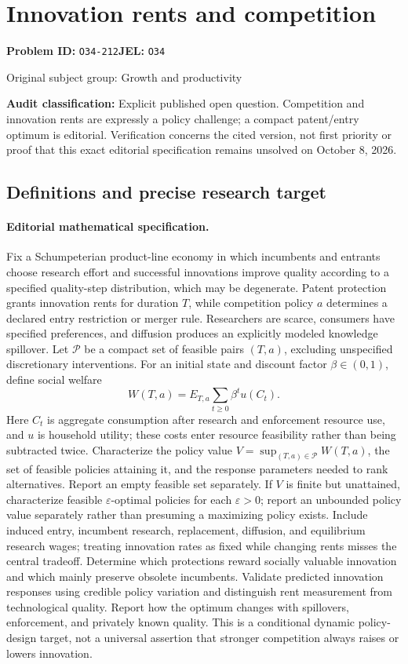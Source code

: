 \documentclass[11pt,a4paper]{article}
\begin{document}
\section*{Innovation rents and competition}
\textbf{Problem ID:} \texttt{O34-212}\quad \textbf{JEL:} \texttt{O34}\par
\label{problem:OP-0268}
{\sffamily\small\color{muted}Original subject group: Growth and productivity\par}
\label{definitions:problem:30007549}
\textbf{Audit classification:} Explicit published open question. Competition and innovation rents are expressly a policy challenge; a compact patent/entry optimum is editorial. Verification concerns the cited version, not first priority or proof that this exact editorial specification remains unsolved on October 8, 2026.
\subsection*{Definitions and precise research target}
\paragraph{Editorial mathematical specification.} Fix a Schumpeterian product-line economy in which incumbents and entrants choose research effort and successful innovations improve quality according to a specified quality-step distribution, which may be degenerate. Patent protection grants innovation rents for duration \(T\), while competition policy \(a\) determines a declared entry restriction or merger rule. Researchers are scarce, consumers have specified preferences, and diffusion produces an explicitly modeled knowledge spillover. Let \(\mathcal P\) be a compact set of feasible pairs \((T,a)\), excluding unspecified discretionary interventions.
For an initial state and discount factor \(\beta\in(0,1)\), define social welfare
\[
W(T,a)=E_{T,a}\sum_{t\ge0}\beta^t
u(C_t).
\]
Here \(C_t\) is aggregate consumption after research and enforcement resource use, and \(u\) is household utility; these costs enter resource feasibility rather than being subtracted twice. Characterize the policy value \(V=\sup_{(T,a)\in\mathcal P}W(T,a)\), the set of feasible policies attaining it, and the response parameters needed to rank alternatives. Report an empty feasible set separately. If \(V\) is finite but unattained, characterize feasible \(\varepsilon\)-optimal policies for each \(\varepsilon>0\); report an unbounded policy value separately rather than presuming a maximizing policy exists. Include induced entry, incumbent research, replacement, diffusion, and equilibrium research wages; treating innovation rates as fixed while changing rents misses the central tradeoff. Determine which protections reward socially valuable innovation and which mainly preserve obsolete incumbents. Validate predicted innovation responses using credible policy variation and distinguish rent measurement from technological quality. Report how the optimum changes with spillovers, enforcement, and privately known quality. This is a conditional dynamic policy-design target, not a universal assertion that stronger competition always raises or lowers innovation.
\end{document}
